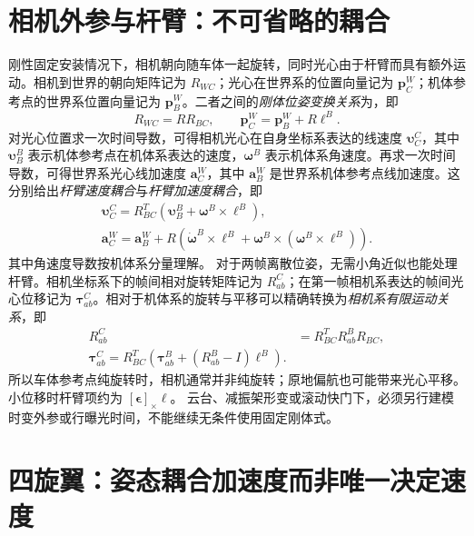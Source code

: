 \documentclass[UTF8,a4paper,fontset=fandol,11pt]{ctexart}
\newcommand{\sk}[1]{[#1]_{\times}}
\newcommand{\vct}[1]{\bm #1}
\begin{document}
\section{相机外参与杆臂：不可省略的耦合}
刚性固定安装情况下，相机朝向随车体一起旋转，同时光心由于杆臂而具有额外运动。相机到世界的朝向矩阵记为 $R_{WC}$；光心在世界系的位置向量记为 $\vct p_C^W$；机体参考点的世界系位置向量记为 $\vct p_B^W$。二者之间的\emph{刚体位姿变换关系}为，即
\begin{equation}
 R_{WC}=R R_{BC},\qquad
 \vct p_C^W=\vct p_B^W+R\vct\ell^B.
\end{equation}
对光心位置求一次时间导数，可得相机光心在自身坐标系表达的线速度 $\vct\upsilon_C^C$，其中 $\vct\upsilon_B^B$ 表示机体参考点在机体系表达的速度，$\vct\omega^B$ 表示机体系角速度。再求一次时间导数，可得世界系光心线加速度 $\vct a_C^W$，其中 $\vct a_B^W$ 是世界系机体参考点线加速度。这分别给出\emph{杆臂速度耦合}与\emph{杆臂加速度耦合}，即
\begin{align}
 \boxed{\vct\upsilon_C^C=R_{BC}^T
 (\vct\upsilon_B^B+\vct\omega^B\times\vct\ell^B)},\label{eq:leverv}\\
 \vct a_C^W=\vct a_B^W+R\left(
 \dot{\vct\omega}^B\times\vct\ell^B+
 \vct\omega^B\times(\vct\omega^B\times\vct\ell^B)\right).\label{eq:levera}
\end{align}
其中角速度导数按机体系分量理解。
对于两帧离散位姿，无需小角近似也能处理杆臂。相机坐标系下的帧间相对旋转矩阵记为 $R_{ab}^C$；在第一帧相机系表达的帧间光心位移记为 $\vct\tau_{ab}^C$。相对于机体系的旋转与平移可以精确转换为\emph{相机系有限运动关系}，即
\begin{align}
 R_{ab}^C&=R_{BC}^TR_{ab}^B R_{BC},\\
 \boxed{\vct\tau_{ab}^C=R_{BC}^T
 \left(\vct\tau_{ab}^B+(R_{ab}^B-I)\vct\ell^B\right)}.\label{eq:leverfinite}
\end{align}
所以车体参考点纯旋转时，相机通常并非纯旋转；原地偏航也可能带来光心平移。
小位移时杆臂项约为 $\sk{\vct\epsilon}\vct\ell$。
云台、减振架形变或滚动快门下，必须另行建模时变外参或行曝光时间，不能继续无条件使用固定刚体式。

\section{四旋翼：姿态耦合加速度而非唯一决定速度}
\end{document}
